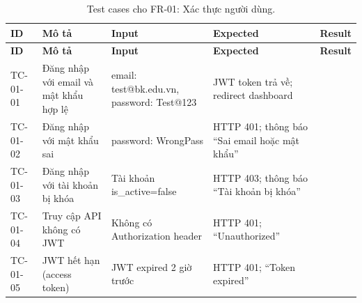 \begin{longtable}{|p{1.5cm}|p{4.5cm}|p{3.5cm}|p{3cm}|p{2cm}|}
    \caption{Test cases cho FR-01: Xác thực người dùng.} \label{tab:tc-fr01} \\
    \hline
    \textbf{ID} & \textbf{Mô tả} & \textbf{Input} & \textbf{Expected} & \textbf{Result} \\
    \hline
    \endfirsthead \hline
    \textbf{ID} & \textbf{Mô tả} & \textbf{Input} & \textbf{Expected} & \textbf{Result} \\
    \hline \endhead

    TC-01-01 & Đăng nhập với email và mật khẩu hợp lệ &
        email: test@bk.edu.vn, password: Test@123 &
        JWT token trả về; redirect dashboard & \\ \hline

    TC-01-02 & Đăng nhập với mật khẩu sai &
        password: WrongPass &
        HTTP 401; thông báo ``Sai email hoặc mật khẩu'' & \\ \hline

    TC-01-03 & Đăng nhập với tài khoản bị khóa &
        Tài khoản is\_active=false &
        HTTP 403; thông báo ``Tài khoản bị khóa'' & \\ \hline

    TC-01-04 & Truy cập API không có JWT &
        Không có Authorization header &
        HTTP 401; ``Unauthorized'' & \\ \hline

    TC-01-05 & JWT hết hạn (access token) &
        JWT expired 2 giờ trước &
        HTTP 401; ``Token expired'' & \\ \hline
\end{longtable}

